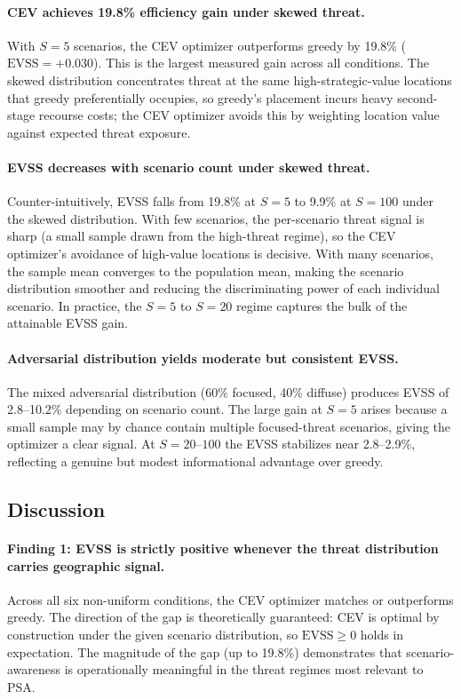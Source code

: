 \documentclass[11pt]{article}
\begin{document}
\paragraph{CEV achieves 19.8\% efficiency gain under skewed threat.}
With $S = 5$ scenarios, the CEV optimizer outperforms greedy by 19.8\%
($\mathrm{EVSS} = +0.030$).  This is the largest measured gain across
all conditions.  The skewed distribution concentrates threat at the
same high-strategic-value locations that greedy preferentially occupies,
so greedy's placement incurs heavy second-stage recourse costs; the CEV
optimizer avoids this by weighting location value against expected threat
exposure.

\paragraph{EVSS decreases with scenario count under skewed threat.}
Counter-intuitively, EVSS falls from 19.8\% at $S = 5$ to 9.9\% at
$S = 100$ under the skewed distribution.  With few scenarios, the
per-scenario threat signal is sharp (a small sample drawn from the
high-threat regime), so the CEV optimizer's avoidance of high-value
locations is decisive.  With many scenarios, the sample mean converges
to the population mean, making the scenario distribution smoother and
reducing the discriminating power of each individual scenario.
In practice, the $S = 5$ to $S = 20$ regime captures the bulk of the
attainable EVSS gain.

\paragraph{Adversarial distribution yields moderate but consistent EVSS.}
The mixed adversarial distribution (60\% focused, 40\% diffuse) produces
EVSS of 2.8--10.2\% depending on scenario count.  The large gain at
$S = 5$ arises because a small sample may by chance contain multiple
focused-threat scenarios, giving the optimizer a clear signal.  At
$S = 20$--$100$ the EVSS stabilizes near 2.8--2.9\%, reflecting
a genuine but modest informational advantage over greedy.

\subsection{Discussion}
\label{sec:exp2:discussion}

\paragraph{Finding 1: EVSS is strictly positive whenever the threat
distribution carries geographic signal.}
Across all six non-uniform conditions, the CEV optimizer matches or
outperforms greedy.  The direction of the gap is theoretically guaranteed:
CEV is optimal by construction under the given scenario distribution, so
$\mathrm{EVSS} \geq 0$ holds in expectation.  The magnitude of the gap
(up to 19.8\%) demonstrates that scenario-awareness is operationally
meaningful in the threat regimes most relevant to PSA.
\end{document}
